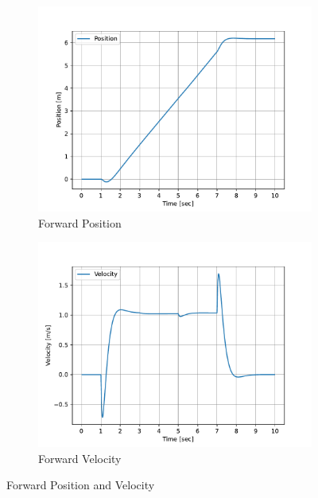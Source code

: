 \begin{figure}[h]
	\centering
	\begin{subfigure}[t]{0.45\textwidth}
		\includegraphics[width=\textwidth]{S}
		\caption{Forward Position}
		\label{fig:S}
	\end{subfigure}
	\begin{subfigure}[t]{0.45\textwidth}
		\includegraphics[width=\textwidth]{S_dot}
		\caption{Forward Velocity}
		\label{fig:S dot}
	\end{subfigure}
	\caption{Forward Position and Velocity}
	\label{fig:S and S dot}
\end{figure}

